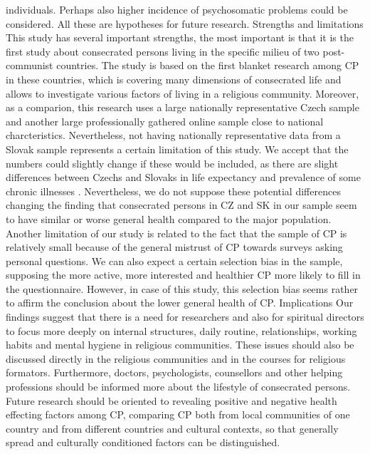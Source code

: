 \documentclass[ijerph,article,accept,moreauthors,pdftex]{mdpi}
\begin{document}
individuals. Perhaps also higher incidence of psychosomatic problems
could be considered. All these are hypotheses for future research.
Strengths and limitations This study has several important strengths,
the most important is that it is the first study about consecrated
persons living in the specific milieu of two post-communist countries.
The study is based on the first blanket research among CP in these
countries, which is covering many dimensions of consecrated life and
allows to investigate various factors of living in a religious
community. Moreover, as a comparion, this research uses a large
nationally representative Czech sample and another large professionally
gathered online sample close to national charcteristics. Nevertheless,
not having nationally representative data from a Slovak sample
represents a certain limitation of this study. We accept that the
numbers could slightly change if these would be included, as there are
slight differences between Czechs and Slovaks in life expectancy and
prevalence of some chronic illnesses \citep{vagavsova2017disparities}.
Nevertheless, we do not suppose these potential differences changing the
finding that consecrated persons in CZ and SK in our sample seem to have
similar or worse general health compared to the major population.
Another limitation of our study is related to the fact that the sample
of CP is relatively small because of the general mistrust of CP towards
surveys asking personal questions. We can also expect a certain
selection bias in the sample, supposing the more active, more interested
and healthier CP more likely to fill in the questionnaire. However, in
case of this study, this selection bias seems rather to affirm the
conclusion about the lower general health of CP. Implications Our
findings suggest that there is a need for researchers and also for
spiritual directors to focus more deeply on internal structures, daily
routine, relationships, working habits and mental hygiene in religious
communities. These issues should also be discussed directly in the
religious communities and in the courses for religious formators.
Furthermore, doctors, psychologists, counsellors and other helping
professions should be informed more about the lifestyle of consecrated
persons. Future research should be oriented to revealing positive and
negative health effecting factors among CP, comparing CP both from local
communities of one country and from different countries and cultural
contexts, so that generally spread and culturally conditioned factors
can be distinguished.
\end{document}
